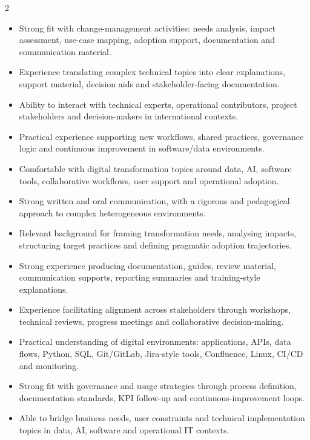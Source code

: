 \documentclass[8pt,a4paper,ragged2e,withhyper]{altacv}
\begin{document}
\begin{paracol}{2}
\begin{itemize}
  \item Strong fit with change-management activities: needs analysis, impact assessment, use-case mapping, adoption support, documentation and communication material.
  \item Experience translating complex technical topics into clear explanations, support material, decision aids and stakeholder-facing documentation.
  \item Ability to interact with technical experts, operational contributors, project stakeholders and decision-makers in international contexts.
  \item Practical experience supporting new workflows, shared practices, governance logic and continuous improvement in software/data environments.
  \item Comfortable with digital transformation topics around data, AI, software tools, collaborative workflows, user support and operational adoption.
  \item Strong written and oral communication, with a rigorous and pedagogical approach to complex heterogeneous environments.
\end{itemize}


\begin{itemize}
  \item Relevant background for framing transformation needs, analysing impacts, structuring target practices and defining pragmatic adoption trajectories.
  \item Strong experience producing documentation, guides, review material, communication supports, reporting summaries and training-style explanations.
  \item Experience facilitating alignment across stakeholders through workshops, technical reviews, progress meetings and collaborative decision-making.
  \item Practical understanding of digital environments: applications, APIs, data flows, Python, SQL, Git/GitLab, Jira-style tools, Confluence, Linux, CI/CD and monitoring.
  \item Strong fit with governance and usage strategies through process definition, documentation standards, KPI follow-up and continuous-improvement loops.
  \item Able to bridge business needs, user constraints and technical implementation topics in data, AI, software and operational IT contexts.
\end{itemize}


\end{paracol}
\end{document}
